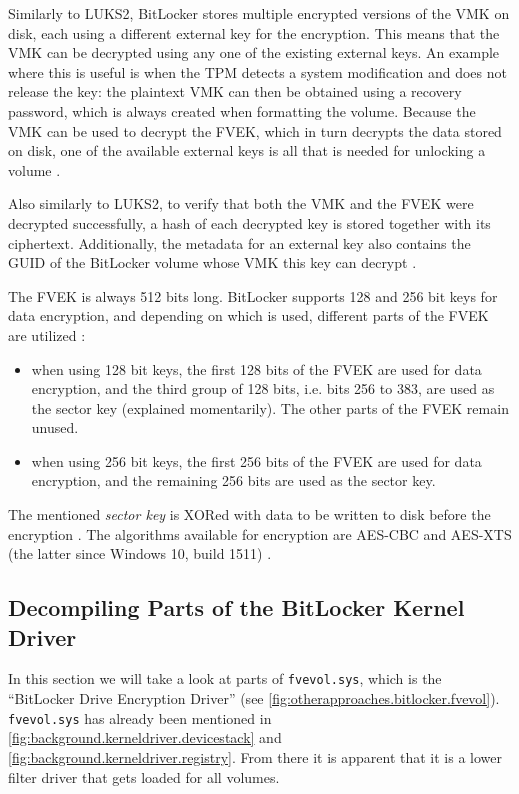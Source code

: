 Similarly to LUKS2, BitLocker stores multiple encrypted versions of the VMK on disk, each using a different external key for the encryption. This means that the VMK can be decrypted using any one of the existing external keys. An example where this is useful is when the TPM detects a system modification and does not release the key: the plaintext VMK can then be obtained using a recovery password, which is always created when formatting the volume. Because the VMK can be used to decrypt the FVEK, which in turn decrypts the data stored on disk, one of the available external keys is all that is needed for unlocking a volume \cite{Kornblum2009}.

Also similarly to LUKS2, to verify that both the VMK and the FVEK were decrypted successfully, a hash of each decrypted key is stored together with its ciphertext. Additionally, the metadata for an external key also contains the GUID of the BitLocker volume whose VMK this key can decrypt \cite{Kornblum2009}.

The FVEK is always 512 bits long. BitLocker supports 128 and 256 bit keys for data encryption, and depending on which is used, different parts of the FVEK are utilized \cite{Kornblum2009}:
\begin{itemize}
	\item when using 128 bit keys, the first 128 bits of the FVEK are used for data encryption, and the third group of 128 bits, i.e. bits 256 to 383, are used as the sector key (explained momentarily). The other parts of the FVEK remain unused.
	\item when using 256 bit keys, the first 256 bits of the FVEK are used for data encryption, and the remaining 256 bits are used as the sector key.
\end{itemize}

The mentioned \emph{sector key} is XORed with data to be written to disk before the encryption \cite{Kornblum2009}. The algorithms available for encryption are AES-CBC and AES-XTS (the latter since Windows 10, build 1511) \cite{Sosnowski2016}.

\subsection{Decompiling Parts of the BitLocker Kernel Driver}
\label{chap:otherapproaches.bitlocker.decompiling}
In this section we will take a look at parts of \texttt{fvevol.sys}, which is the ``BitLocker Drive Encryption Driver'' (see \autoref{fig:otherapproaches.bitlocker.fvevol}). \texttt{fvevol.sys} has already been mentioned in \autoref{fig:background.kerneldriver.devicestack} and \autoref{fig:background.kerneldriver.registry}. From there it is apparent that it is a lower filter driver that gets loaded for all volumes.

